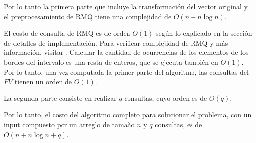 Por lo tanto la primera parte que incluye la transformación del vector
original y el preprocesamiento de RMQ tiene una complejidad de $O(n + n\log n)$.

El costo de consulta de RMQ es de orden $O(1)$ según lo explicado en la
sección de detalles de implementación. Para verificar complejidad de RMQ y
más información, visitar \cite{topcoder}. Calcular la cantidad de ocurrencias
de los elementos de los bordes del intervalo es una resta de enteros, que se
ejecuta también en $O(1)$. Por lo tanto, una vez computada la primer parte del
algoritmo, las consultas del $FV$ tienen un orden de $O(1)$.

La segunda parte consiste en realizar $q$ consultas, cuyo orden es de $O(q)$.

Por lo tanto, el costo del algoritmo completo para solucionar el problema, con un
input compuesto por un arreglo de tamaño $n$ y $q$ consultas, es de
$O(n + n\log n + q)$.



